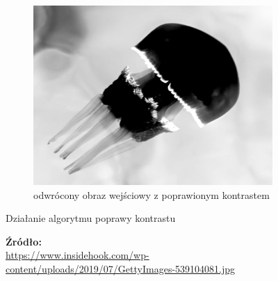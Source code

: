 \begin{figure}[H]
\begin{subfigure}{0.31\textwidth}
        \end{subfigure}
        \begin{subfigure}{0.31\textwidth}
            \centering
            \includegraphics[width = \textwidth]{img/2-theory/20-inv-jellyfish.png}
            \caption{odwrócony obraz wejściowy z poprawionym kontrastem}
            \label{theory-technics-contrast-jellyfish-c}
        \end{subfigure}
        \caption{Działanie algorytmu poprawy kontrastu}
        \caption*{\footnotesize{\textbf{Źródło:}\\
        \url{https://www.insidehook.com/wp-content/uploads/2019/07/GettyImages-539104081.jpg}}}
        \label{theory-technics-contrast-jellyfish}
        \end{figure}
    

